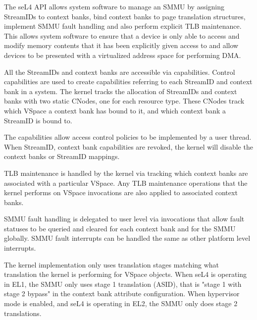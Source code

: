The seL4 API allows system software to manage an SMMU by assigning StreamIDs to
context banks, bind context banks to page translation structures, implement
SMMU fault handling and also perform explicit TLB maintenance.
This allows system software to ensure that a device is only able to access and
modify memory contents that it has been explicitly given access to and allow
devices to be presented with a virtualized address space for performing DMA.

All the StreamIDs and context banks are accessible via capabilities. Control
capabilities are used to create capabilities referring to each StreamID and
context bank in a system. The kernel tracks the allocation of StreamIDs and
context banks with two static CNodes, one for each resource type. These CNodes
track which VSpace a context bank has bound to it, and which context bank a
StreamID is bound to.

The capabilities allow access control policies to be implemented by a user thread.
When StreamID, context bank capabilities are revoked, the kernel will disable
the context banks or StreamID mappings.

TLB maintenance is handled by the kernel via tracking which context banks are
associated with a particular VSpace. Any TLB maintenance operations that the
kernel performs on VSpace invocations are also applied to associated context
banks.

SMMU fault handling is delegated to user level via invocations that allow fault
statuses to be queried and cleared for each context bank and for the SMMU globally.
SMMU fault interrupts can be handled the same as other platform level interrupts.

The kernel implementation only uses translation stages matching what translation
the kernel is performing for VSpace objects. When seL4 is operating in EL1,
the SMMU only uses stage 1 translation (ASID), that is "stage 1 with stage 2
bypass" in the context bank attribute configuration. When hypervisor mode is
enabled, and seL4 is operating in EL2, the SMMU only does stage 2 translations.

